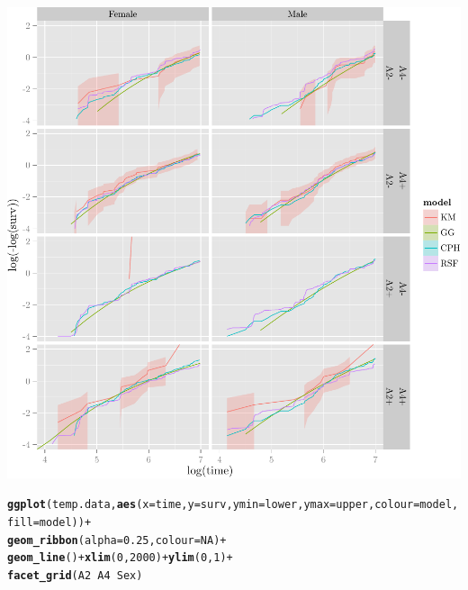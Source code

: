\documentclass{article}\usepackage[]{graphicx}\usepackage[]{color}
\makeatletter
\def\maxwidth{ %
  \ifdim\Gin@nat@width>\linewidth
    \linewidth
  \else
    \Gin@nat@width
  \fi
}
\newcommand{\hlnum}[1]{\textcolor[rgb]{0.686,0.059,0.569}{#1}}%
\newcommand{\hlopt}[1]{\textcolor[rgb]{0,0,0}{#1}}%
\newcommand{\hlstd}[1]{\textcolor[rgb]{0.345,0.345,0.345}{#1}}%
\newcommand{\hlkwc}[1]{\textcolor[rgb]{0.333,0.667,0.333}{#1}}%
\newcommand{\hlkwd}[1]{\textcolor[rgb]{0.737,0.353,0.396}{\textbf{#1}}}%
\newenvironment{kframe}{%
 \def\at@end@of@kframe{}%
 \ifinner\ifhmode%
  \def\at@end@of@kframe{\end{minipage}}%
  \begin{minipage}{\columnwidth}%
 \fi\fi%
 \def\FrameCommand##1{\hskip\@totalleftmargin \hskip-\fboxsep
 \colorbox{shadecolor}{##1}\hskip-\fboxsep
     \hskip-\linewidth \hskip-\@totalleftmargin \hskip\columnwidth}%
 \MakeFramed {\advance\hsize-\width
   \@totalleftmargin\z@ \linewidth\hsize
   \@setminipage}}%
 {\par\unskip\endMakeFramed%
 \at@end@of@kframe}
\newenvironment{knitrout}{}{} %
\makeatother
\begin{document}
\begin{knitrout}
{\centering \includegraphics[width=\maxwidth]{figure/05-final-fit-assessment-3} 

}


\begin{kframe}\begin{alltt}
\hlkwd{ggplot}\hlstd{(temp.data,} \hlkwd{aes}\hlstd{(}\hlkwc{x} \hlstd{= time,} \hlkwc{y} \hlstd{= surv,} \hlkwc{ymin} \hlstd{= lower,} \hlkwc{ymax} \hlstd{= upper,} \hlkwc{colour} \hlstd{= model,} \hlkwc{fill} \hlstd{= model))} \hlopt{+}
        \hlkwd{geom_ribbon}\hlstd{(}\hlkwc{alpha} \hlstd{=} \hlnum{0.25}\hlstd{,} \hlkwc{colour} \hlstd{=} \hlnum{NA}\hlstd{)} \hlopt{+}
        \hlkwd{geom_line}\hlstd{()} \hlopt{+} \hlkwd{xlim}\hlstd{(}\hlnum{0}\hlstd{,} \hlnum{2000}\hlstd{)} \hlopt{+} \hlkwd{ylim}\hlstd{(}\hlnum{0}\hlstd{,} \hlnum{1}\hlstd{)} \hlopt{+}
        \hlkwd{facet_grid}\hlstd{(A2} \hlopt{~} \hlstd{A4} \hlopt{~} \hlstd{Sex)}
\end{alltt}


{\ttfamily\noindent\color{warningcolor}{\#\# Warning: Removed 5 rows containing missing values (geom\_path).}}

{\ttfamily\noindent\color{warningcolor}{\#\# Warning: Removed 4 rows containing missing values (geom\_path).}}

{\ttfamily\noindent\color{warningcolor}{\#\# Warning: Removed 5 rows containing missing values (geom\_path).}}


\end{kframe}
\end{knitrout}
\end{document}
